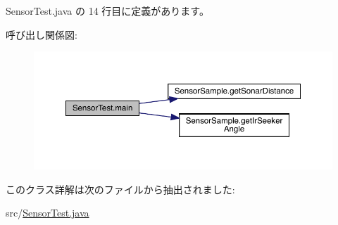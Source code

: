  Sensor\+Test.\+java の 14 行目に定義があります。

呼び出し関係図\+:
\nopagebreak
\begin{figure}[H]
\begin{center}
\leavevmode
\includegraphics[width=350pt]{d4/d99/class_sensor_test_a81c6db5da71c1f91cf56f971b39d98b1_cgraph}
\end{center}
\end{figure}


このクラス詳解は次のファイルから抽出されました\+:\begin{DoxyCompactItemize}
\item 
src/\mbox{\hyperlink{_sensor_test_8java}{Sensor\+Test.\+java}}\end{DoxyCompactItemize}
